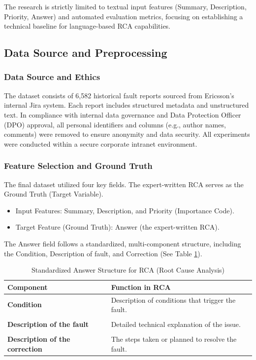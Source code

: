 \documentclass[10pt,twocolumn,journal]{IEEEtran}
\begin{document}
The research is strictly limited to textual input features (Summary, Description, Priority, Answer) and automated evaluation metrics, focusing on establishing a technical baseline for language-based RCA capabilities.

\subsection{Data Source and Preprocessing}
\label{sec:data-preprocessing}

\subsubsection{Data Source and Ethics}
The dataset consists of 6,582 historical fault reports sourced from Ericsson's internal Jira system. Each report includes structured metadata and unstructured text. In compliance with internal data governance and Data Protection Officer (DPO) approval, all personal identifiers and columns (e.g., author names, comments) were removed to ensure anonymity and data security. All experiments were conducted within a secure corporate intranet environment.

\subsubsection{Feature Selection and Ground Truth}
The final dataset utilized four key fields. The expert-written RCA serves as the Ground Truth (Target Variable).
\begin{itemize}
    \item Input Features: Summary, Description, and Priority (Importance Code).
    \item Target Feature (Ground Truth): Answer (the expert-written RCA).
\end{itemize}
The Answer field follows a standardized, multi-component structure, including the Condition, Description of fault, and Correction (See Table \ref{tab:answer-structure}).

\begin{table}[ht]
\centering
\caption{Standardized Answer Structure for RCA (Root Cause Analysis)}
\label{tab:answer-structure}
\begin{tabularx}{\columnwidth}{>{\bfseries}p{} >{\raggedright\arraybackslash}X }
\toprule
Component & Function in RCA \\
\midrule
Condition & Description of conditions that trigger the fault. \\
\\
Description of the fault & Detailed technical explanation of the issue. \\
\\
Description of the correction & The steps taken or planned to resolve the fault. \\
\bottomrule
\end{tabularx}
\vspace{1em}
\end{table}
\end{document}
